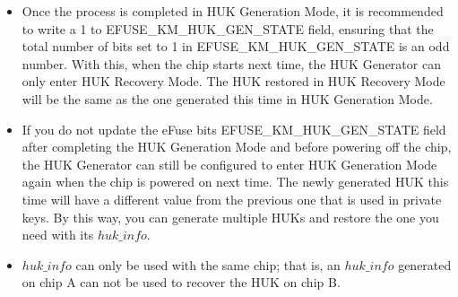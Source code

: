 \documentclass[main\_\_EN.tex]{subfiles}
\begin{document}
\begin{tiplisting}
\vspace{-2em}
\begin{itemize}
    \item Once the process is completed in HUK Generation Mode, it is recommended to write a 1 to EFUSE\_KM\_HUK\_GEN\_STATE field, ensuring that the total number of bits set to 1 in EFUSE\_KM\_HUK\_GEN\_STATE is an odd number. With this, when the chip starts next time, the HUK Generator can only enter HUK Recovery Mode. The HUK restored in HUK Recovery Mode will be the same as the one generated this time in HUK Generation Mode.
    \item If you do not update the eFuse bits EFUSE\_KM\_HUK\_GEN\_STATE field after completing the HUK Generation Mode and before powering off the chip, the HUK Generator can still be configured to enter HUK Generation Mode again when the chip is powered on next time. The newly generated HUK this time will have a different value from the previous one that is used in private keys. By this way, you can generate multiple HUKs and restore the one you need with its \hyperref[para:hukinfo]{\begin{math}huk\_info\end{math}}.
    \item \hyperref[para:hukinfo]{\begin{math}huk\_info\end{math}} can only be used with the same chip; that is, an \hyperref[para:hukinfo]{\begin{math}huk\_info\end{math}} generated on chip A can not be used to recover the HUK on chip B.
\end{itemize}
\end{tiplisting}
\end{document}
